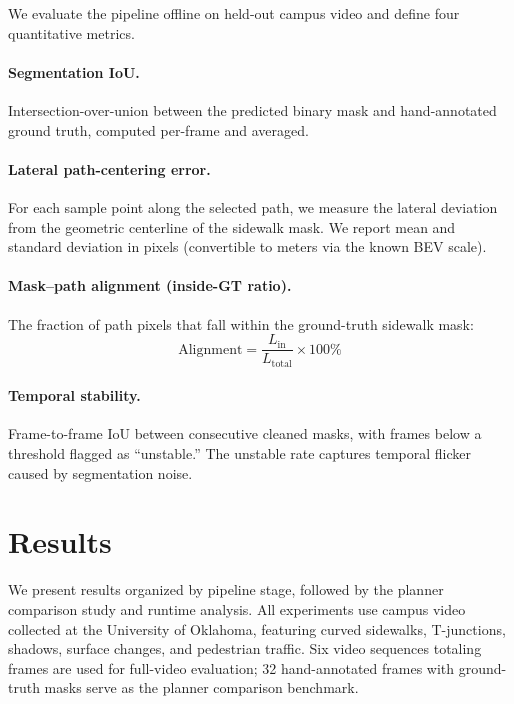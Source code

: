 \documentclass[a4paper,fleqn,10pt]{cas-dc}
\begin{document}
We evaluate the pipeline offline on held-out campus video and define four quantitative metrics.

\paragraph{Segmentation IoU.}
Intersection-over-union between the predicted binary mask and hand-annotated ground truth, computed per-frame and averaged.

\paragraph{Lateral path-centering error.}
For each sample point along the selected path, we measure the lateral deviation from the geometric centerline of the sidewalk mask. We report mean and standard deviation in pixels (convertible to meters via the known BEV scale).

\paragraph{Mask--path alignment (inside-GT ratio).}
The fraction of path pixels that fall within the ground-truth sidewalk mask:
\[
\text{Alignment} = \frac{L_{\text{in}}}{L_{\text{total}}} \times 100\%
\]

\paragraph{Temporal stability.}
Frame-to-frame IoU between consecutive cleaned masks, with frames below a threshold flagged as ``unstable.'' The unstable rate captures temporal flicker caused by segmentation noise.


\section{Results}
\label{sec:results}

We present results organized by pipeline stage, followed by the planner comparison study and runtime analysis. All experiments use campus video collected at the University of Oklahoma, featuring curved sidewalks, T-junctions, shadows, surface changes, and pedestrian traffic. Six video sequences totaling  frames are used for full-video evaluation; 32 hand-annotated frames with ground-truth masks serve as the planner comparison benchmark.
\end{document}

